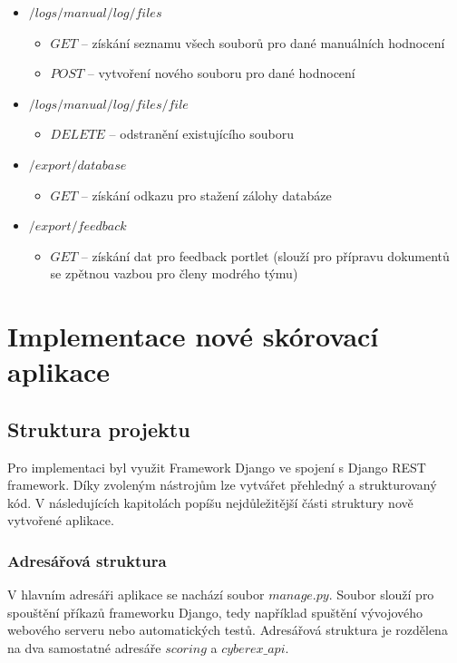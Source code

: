 \documentclass[
  digital, %
  twoside, %
  table,   %
  nolof,     %
  nolot,     %
]{fithesis3}
\begin{document}
\begin{itemize}
    \item $/logs/manual/{log}/files$
    \begin{itemize}
        \item $GET$ -- získání seznamu všech souborů pro dané manuálních hodnocení
        \item $POST$ -- vytvoření nového souboru pro dané hodnocení
    \end{itemize}
            
    \item $/logs/manual/{log}/files/{file}$
    \begin{itemize}
        \item $DELETE$ -- odstranění existujícího souboru
    \end{itemize}
            
    \item $/export/database$
    \begin{itemize}
        \item $GET$ -- získání odkazu pro stažení zálohy databáze
    \end{itemize}
                
    \item $/export/feedback$
    \begin{itemize}
        \item $GET$ -- získání dat pro feedback portlet (slouží pro přípravu dokumentů se zpětnou vazbou pro členy modrého týmu)
    \end{itemize}

\end{itemize}


\chapter{Implementace nové skórovací aplikace}

\section{Struktura projektu}
Pro implementaci byl využit Framework Django ve spojení s Django REST framework. Díky zvoleným nástrojům lze vytvářet přehledný a strukturovaný kód. V následujících kapitolách popíšu nejdůležitější části struktury nově vytvořené aplikace.

\subsection{Adresářová struktura}
V hlavním adresáři aplikace se nachází soubor $manage.py$. Soubor slouží pro spouštění příkazů frameworku Django, tedy například spuštění vývojového webového serveru nebo automatických testů. Adresářová struktura je rozdělena na dva samostatné adresáře $scoring$ a $cyberex\_api$.
\end{document}
